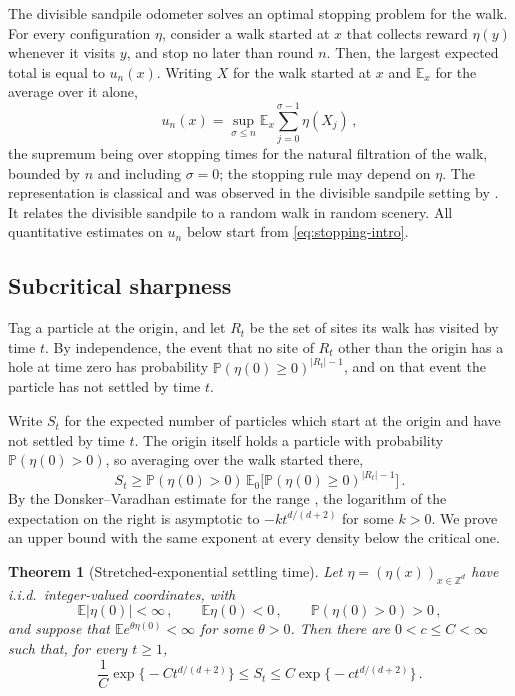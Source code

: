 \documentclass[11pt]{amsart}
\theoremstyle{plain}
\newtheorem{theorem}{Theorem}[section]
\theoremstyle{definition}
\newcommand{\Z}{\mathbb{Z}}
\newcommand{\E}{\mathbb{E}}
\renewcommand{\P}{\mathbb{P}}
\begin{document}
The divisible sandpile odometer solves an optimal stopping problem for the walk. For every configuration $\eta$, consider a walk started at $x$ that collects reward $\eta(y)$ whenever it visits $y$, and stop no later than round $n$. Then, the largest expected total is equal to $u_n(x)$. Writing $X$ for the walk started at $x$ and $\E_x$ for the average over it alone,
\begin{equation}\label{eq:stopping-intro}
	u_n(x)=\sup_{\sigma\leq n}\E_x\sum_{j=0}^{\sigma-1}\eta(X_j)\,,
\end{equation}
the supremum being over stopping times for the natural filtration of the walk, bounded by $n$ and including $\sigma=0$; the stopping rule may depend on $\eta$. The representation is
classical \citep[Chapter~I]{PeskirShiryaev} and was observed in the divisible sandpile setting by \citet{BPRS}. It relates the divisible sandpile to a random walk in random scenery. All quantitative estimates on $u_n$ below start from
\eqref{eq:stopping-intro}.

\subsection{Subcritical sharpness}\label{ssec:results-sub}

Tag a particle at the origin, and let $R_t$ be the set of sites its walk has visited by time $t$. By independence, the event that no site of $R_t$ other than the origin has a hole at time zero has probability $\P(\eta(0)\geq0)^{|R_t|-1}$, and on that event the particle has not settled by time $t$.

Write $S_t$ for the expected number of particles which start at the origin and have not settled by time $t$. The origin itself holds a particle with probability $\P(\eta(0)>0)$, so averaging over the walk started there,
\[
	S_t\geq\P(\eta(0)>0)\,\E_0\bigl[\P(\eta(0)\geq0)^{|R_t|-1}\bigr]\,.
\]
By the Donsker--Varadhan estimate for the range
\citep[Theorem~1]{DonskerVaradhan}, the logarithm of the expectation on the
right is asymptotic to $-kt^{d/(d+2)}$ for some $k>0$. We prove an upper bound
with the same exponent at every density below the critical one.

\begin{theorem}[Stretched-exponential settling time]\label{thm:subcritical-tail}
	Let $\eta=(\eta(x))_{x\in\Z^d}$ have i.i.d.\ integer-valued coordinates,
	with
	\[
		\E|\eta(0)|<\infty\,,\qquad \E\eta(0)<0\,,\qquad \P(\eta(0)>0)>0\,,
	\]
	and suppose that $\E e^{\theta\eta(0)}<\infty$ for some $\theta>0$. Then there are
	$0<c\leq C<\infty$ such that, for every $t\geq1$,
	\begin{equation}\label{eq:sharpness}
		\frac1C\exp\bigl\{-Ct^{d/(d+2)}\bigr\}\leq S_t\leq
		C\exp\bigl\{-ct^{d/(d+2)}\bigr\}\,.
	\end{equation}
\end{theorem}
\end{document}
